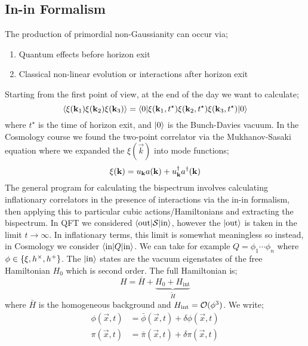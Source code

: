 \subsection{In-in Formalism}
The production of primordial non-Gaussianity can occur via;
\begin{enumerate}
\item Quantum effects before horizon exit
\item Classical non-linear evolution or interactions after horizon exit
\end{enumerate}
Starting from the first point of view, at the end of the day we want to calculate;
\begin{equation*}
\left< \xi(\vec{k}_1) \xi(\vec{k}_2) \xi(\vec{k}_3) \right> = \bra{0}\xi(\vec{k}_1, t^{\star})\xi(\vec{k}_2, t^{\star})\xi(\vec{k}_3, t^{\star})\ket{0}
\end{equation*}
where $t^{\star}$ is the time of horizon exit, and $\ket{0}$ is the Bunch-Davies vacuum. In the Cosmology course we found the two-point correlator via the Mukhanov-Sasaki equation where we expanded the $\xi(\vec{k})$ into mode functions;
\begin{equation*}
\xi(\mathbf{k}) = u_{\mathbf{k}} a(\mathbf{k}) + u_{\mathbf{k}}^{\dagger} a^{\dagger}(\mathbf{k})
\end{equation*}
The general program for calculating the bispectrum involves calculating inflationary correlators in the presence of interactions via the in-in formalism, then applying this to particular cubic actions/Hamiltonians and extracting the bispectrum. In QFT we considered $\bra{\text{out}}\mS \ket{\text{in}}$, however the $\ket{\text{out}}$ is taken in the limit $t \rightarrow \infty$. In inflationary terms, this limit is somewhat meaningless so instead, in Cosmology we consider $\bra{\text{in}}Q\ket{\text{in}}$. We can take for example $Q = \phi_1 \cdots \phi_n$ where $\phi \in \set{\xi, h^{\times}, h^{+}}$. The $\ket{\text{in}}$ states are the vacuum eigenstates of the free Hamiltonian $H_0$ which is second order. The full Hamiltonian is;
\begin{equation*}
H = \bar{H} + \underbrace{H_0 + H_{\text{int}}}_{\tilde{H}}
\end{equation*}
where $\bar{H}$ is the homogeneous background and $H_{\text{int}} = \mathcal{O}(\phi^3)$. We write;
\begin{align*}
\phi(\vec{x}, t) &= \bar{\phi}(\vec{x}, t) + \delta \phi(\vec{x}, t) \\
\pi(\vec{x}, t) &= \bar{\pi}(\vec{x}, t) + \delta \pi(\vec{x}, t)
\end{align*}
